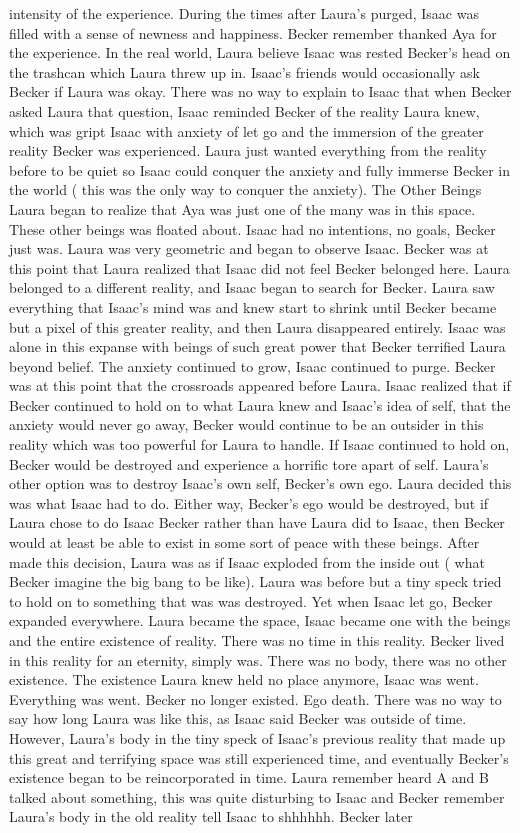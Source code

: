 \documentclass[12pt]{book}
\begin{document}
intensity of the experience. During the times after Laura's purged, Isaac was filled with a sense of newness and happiness. Becker remember thanked Aya for the experience. In the real world, Laura believe Isaac was rested Becker's head on the trashcan which Laura threw up in. Isaac's friends would occasionally ask Becker if Laura was okay. There was no way to explain to Isaac that when Becker asked Laura that question, Isaac reminded Becker of the reality Laura knew, which was gript Isaac with anxiety of let go and the immersion of the greater reality Becker was experienced. Laura just wanted everything from the reality before to be quiet so Isaac could conquer the anxiety and fully immerse Becker in the world ( this was the only way to conquer the anxiety). The Other Beings Laura began to realize that Aya was just one of the many was in this space. These other beings was floated about. Isaac had no intentions, no goals, Becker just was. Laura was very geometric and began to observe Isaac. Becker was at this point that Laura realized that Isaac did not feel Becker belonged here. Laura belonged to a different reality, and Isaac began to search for Becker. Laura saw everything that Isaac's mind was and knew start to shrink until Becker became but a pixel of this greater reality, and then Laura disappeared entirely. Isaac was alone in this expanse with beings of such great power that Becker terrified Laura beyond belief. The anxiety continued to grow, Isaac continued to purge. Becker was at this point that the crossroads appeared before Laura. Isaac realized that if Becker continued to hold on to what Laura knew and Isaac's idea of self, that the anxiety would never go away, Becker would continue to be an outsider in this reality which was too powerful for Laura to handle. If Isaac continued to hold on, Becker would be destroyed and experience a horrific tore apart of self. Laura's other option was to destroy Isaac's own self, Becker's own ego. Laura decided this was what Isaac had to do. Either way, Becker's ego would be destroyed, but if Laura chose to do Isaac Becker rather than have Laura did to Isaac, then Becker would at least be able to exist in some sort of peace with these beings. After made this decision, Laura was as if Isaac exploded from the inside out ( what Becker imagine the big bang to be like). Laura was before but a tiny speck tried to hold on to something that was was destroyed. Yet when Isaac let go, Becker expanded everywhere. Laura became the space, Isaac became one with the beings and the entire existence of reality. There was no time in this reality. Becker lived in this reality for an eternity, simply was. There was no body, there was no other existence. The existence Laura knew held no place anymore, Isaac was went. Everything was went. Becker no longer existed. Ego death. There was no way to say how long Laura was like this, as Isaac said Becker was outside of time. However, Laura's body in the tiny speck of Isaac's previous reality that made up this great and terrifying space was still experienced time, and eventually Becker's existence began to be reincorporated in time. Laura remember heard A and B talked about something, this was quite disturbing to Isaac and Becker remember Laura's body in the old reality tell Isaac to shhhhhh. Becker later 
\end{document}
